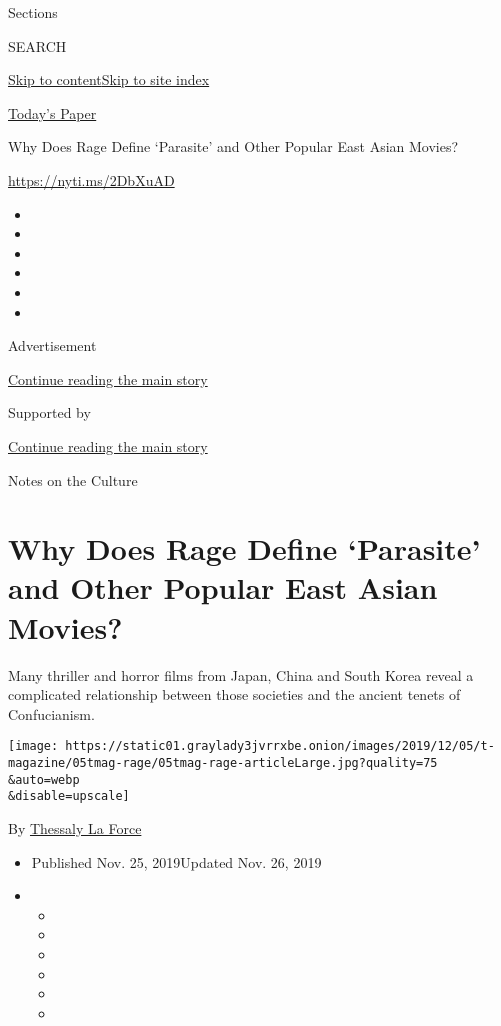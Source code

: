 Sections

SEARCH

\protect\hyperlink{site-content}{Skip to
content}\protect\hyperlink{site-index}{Skip to site index}

\href{https://myaccount.nytimes3xbfgragh.onion/auth/login?response_type=cookie\&client_id=vi}{}

\href{https://www.nytimes3xbfgragh.onion/section/todayspaper}{Today's
Paper}

Why Does Rage Define `Parasite' and Other Popular East Asian Movies?

\url{https://nyti.ms/2DbXuAD}

\begin{itemize}
\item
\item
\item
\item
\item
\item
\end{itemize}

Advertisement

\protect\hyperlink{after-top}{Continue reading the main story}

Supported by

\protect\hyperlink{after-sponsor}{Continue reading the main story}

Notes on the Culture

\hypertarget{why-does-rage-define-parasite-and-other-popular-east-asian-movies}{%
\section{Why Does Rage Define `Parasite' and Other Popular East Asian
Movies?}\label{why-does-rage-define-parasite-and-other-popular-east-asian-movies}}

Many thriller and horror films from Japan, China and South Korea reveal
a complicated relationship between those societies and the ancient
tenets of Confucianism.

\texttt{[image: https://static01.graylady3jvrrxbe.onion/images/2019/12/05/t-magazine/05tmag-rage/05tmag-rage-articleLarge.jpg?quality=75\\\&auto=webp\\\&disable=upscale]}

By
\href{https://www.nytimes3xbfgragh.onion/by/thessaly-la-force}{Thessaly
La Force}

\begin{itemize}
\item
  Published Nov. 25, 2019Updated Nov. 26, 2019
\item
  \begin{itemize}
  \item
  \item
  \item
  \item
  \item
  \item
  \end{itemize}
\end{itemize}

